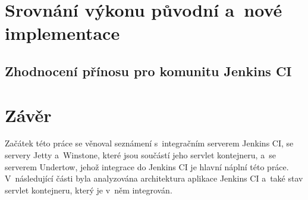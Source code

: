     





    


\chapter{Srovnání výkonu původní a~nové implementace}  \label{kapPerformance}


    \section{Zhodnocení přínosu pro komunitu Jenkins CI}
    


\chapter{Závěr}
    Začátek této práce se věnoval seznámení s~integračním serverem Jenkins CI,
    se servery Jetty a~Winstone, které jsou součástí jeho servlet kontejneru,
    a~se serverem Undertow, jehož integrace do Jenkins CI je hlavní
    náplní této práce. V~následující části byla analyzována architektura aplikace Jenkins CI
    a~také stav servlet kontejneru, který je v~něm integrován.

